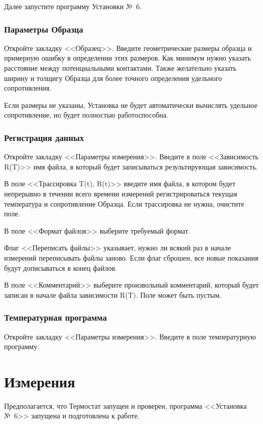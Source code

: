 \documentclass[12pt, a4paper, twocolumn]{report}
\begin{document}
Далее запустите программу Установки №~6.

\subsection{Параметры Образца}

Откройте закладку <<Образец>>. Введите геометрические размеры образца и примерную ошибку в определении этих размеров. Как минимум нужно указать расстояние между потенциальными контактами. Также желательно указать ширину и толщигу Образца для более точного определения удельного сопротивления.

Если размеры не указаны, Установка не будет автоматически вычислять удельное сопротивление, но будет полностью работоспособна.

\subsection{Регистрация данных}

Откройте закладку <<Параметры измерения>>. Введите в поле <<Зависимость R(T)>> имя файла, в который будет записываться результирующая зависимость.

В поле <<Трассировка T(t), R(t)>> введите имя файла, в котором будет непрерывно в течении всего времени измерений регистрироваться текущая температура и сопротивление Образца. Если трассировка не нужна, очистите поле.

В поле <<Формат файлов>> выберите требуемый формат.

Флаг <<Переписать файлы>> указывает, нужно ли всякий раз в начале измерений переписывать файлы заново. Если флаг сброшен, все новые показания будут дописываться в конец файлов.

В поле <<Комментарий>> выберите произвольный комментарий, который будет записан в начале файла зависимости R(T). Поле может быть пустым.

\subsection{Температурная программа}

Откройте закладку <<Параметры измерения>>. Введите в поле  температурную программу.

\chapter{Измерения}

Предполагается, что Термостат запущен и проверен, программа <<Установка №~6>> запущена и подготовлена к работе.
\end{document}
